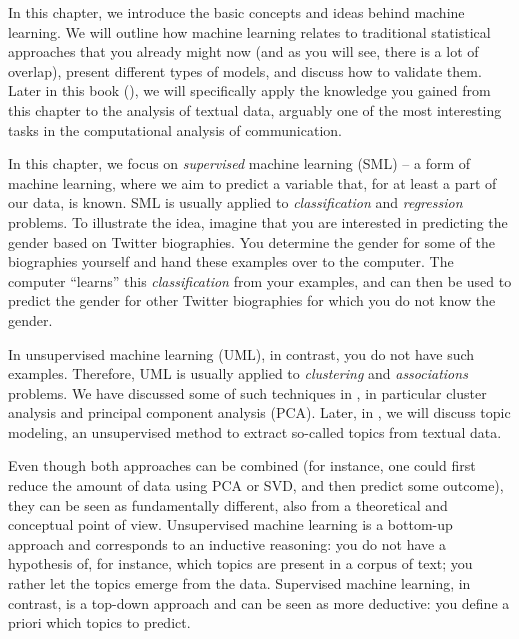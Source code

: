 In this chapter, we introduce the basic concepts and ideas behind
machine learning.  We will outline how machine learning relates to
traditional statistical approaches that you already might now (and as
you will see, there is a lot of overlap), present different types of
models, and discuss how to validate them.
Later in this book (), we will 
specifically apply the knowledge you gained from this chapter to the
analysis of textual data, arguably one of the most interesting tasks
in the computational analysis of communication.

In this chapter, we focus on \emph{supervised} machine learning (SML) 
-- a form of machine learning, where we aim to predict a variable
that, for at least a part of our data, is known. SML is usually applied to \textit{classification} and \textit{regression}  problems. To illustrate the
idea, imagine that you are interested in predicting the gender based
on Twitter biographies. You determine the gender for some of the
biographies yourself and hand these examples over to the computer. The
computer ``learns'' this \textit{classification} from your examples, and can then be used to predict the gender for other Twitter biographies for which you do not
know the gender.

In unsupervised machine learning (UML), in contrast, you do not have such
examples. Therefore, UML is usually applied to \textit{clustering} and \textit{associations} problems. We have discussed some of such techniques in , in particular cluster analysis and
principal component analysis (PCA).
Later, in , we will discuss topic modeling, an unsupervised method to extract so-called topics from textual data.



Even though both approaches can be combined (for instance, one could
first reduce the amount of data using PCA or SVD, and then predict some
outcome), they can be seen as fundamentally different, also from a
theoretical and conceptual point of view.  Unsupervised machine
learning is a bottom-up approach and corresponds to an inductive
reasoning: you do not have a hypothesis of, for instance, which topics
are present in a corpus of text; you rather let the topics emerge from
the data.  Supervised machine learning, in contrast, is a top-down
approach and can be seen as more deductive: you define a priori which
topics to predict.







